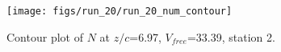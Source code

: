\begin{figure}[H]
\centering
\texttt{[image: figs/run\_20/run\_20\_num\_contour]}
\caption{Contour plot of $N$ at $z/c$=6.97, $V_{free}$=33.39, station 2.}
\label{fig:run_20_num_contour}
\end{figure}


